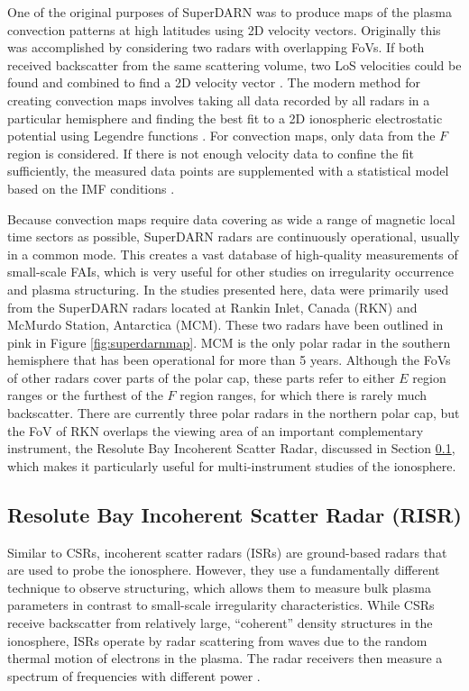 One of the original purposes of SuperDARN was to produce maps of the plasma convection patterns at high latitudes using 2D velocity vectors.  Originally this was accomplished by considering two radars with overlapping FoVs.  If both received backscatter from the same scattering volume, two LoS velocities could be found and combined to find a 2D velocity vector \citep{Ruohoniemi1989}.  The modern method for creating convection maps involves taking all data recorded by all radars in a particular hemisphere and finding the best fit to a 2D ionospheric electrostatic potential using Legendre functions \citep{Ruohoniemi1998}.  For convection maps, only data from the \(F\) region is considered.  If there is not enough velocity data to confine the fit sufficiently, the measured data points are supplemented with a statistical model based on the IMF conditions \citep{Ruohoniemi1995,Ruohoniemi2005}.

Because convection maps require data covering as wide a range of magnetic local time sectors as possible, SuperDARN radars are continuously operational, usually in a common mode.  This creates a vast database of high-quality measurements of small-scale FAIs, which is very useful for other studies on irregularity occurrence and plasma structuring.  In the studies presented here, data were primarily used from the SuperDARN radars located at Rankin Inlet, Canada (RKN) and McMurdo Station, Antarctica (MCM).  These two radars have been outlined in pink in Figure \ref{fig:superdarnmap}.  MCM is the only polar radar in the southern hemisphere that has been operational for more than 5 years.  Although the FoVs of other radars cover parts of the polar cap, these parts refer to either \(E\) region ranges or the furthest of the \(F\) region ranges, for which there is rarely much backscatter.  There are currently three polar radars in the northern polar cap, but the FoV of RKN overlaps the viewing area of an important complementary instrument, the Resolute Bay Incoherent Scatter Radar, discussed in Section \ref{sec:isr}, which makes it particularly useful for multi-instrument studies of the ionosphere.

\subsection{Resolute Bay Incoherent Scatter Radar (RISR)}
\label{sec:isr}
Similar to CSRs, incoherent scatter radars (ISRs) are ground-based radars that are used to probe the ionosphere.  However, they use a fundamentally different technique to observe structuring, which allows them to measure bulk plasma parameters in contrast to small-scale irregularity characteristics.  While CSRs receive backscatter from relatively large, ``coherent'' density structures in the ionosphere, ISRs operate by radar scattering from waves due to the random thermal motion of electrons in the plasma.  The radar receivers then measure a spectrum of frequencies with different power \citep{Gordon1958}.

